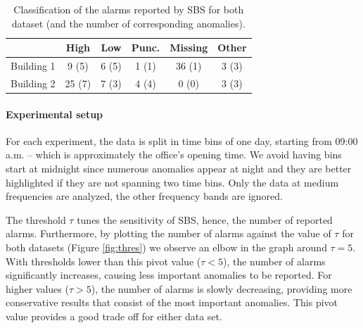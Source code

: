 \begin{table}
\begin{center}
\begin{tabular}{|l||c|c|c|c|c|}
\hline
&High&Low&Punc.&Missing&Other\\ \hline \hline
Building 1& 9 (5) & 6 (5) & 1 (1) & 36 (1) & 3 (3) \\ \hline
Building 2& 25 (7) & 7 (3) & 4 (4) & 0 (0) & 3 (3) \\ \hline
\end{tabular}
\end{center}
\caption{Classification of the alarms reported by SBS for both dataset (and the number of corresponding anomalies).}
\label{tab:classif}
\end{table}

\paragraph{Experimental setup}
For each experiment, the data is split in time bins of one day, starting from 09:00 a.m. -- which is approximately 
the office's opening time.
We avoid having bins start at midnight since numerous anomalies appear at night and they are better highlighted if they are 
not spanning two time bins.
Only the data at medium frequencies are analyzed, the other frequency bands are ignored.


The threshold $\tau$ tunes the sensitivity of SBS, hence, the number of reported alarms.  
Furthermore, by plotting the number of alarms against the value of $\tau$ for both datasets (Figure \ref{fig:thres}) we observe an 
elbow in the graph around $\tau=5$.
With thresholds lower than this pivot value ($\tau<5$), the number of alarms significantly increases, causing less important anomalies 
to be reported.  
For higher values ($\tau>5$), the number of alarms is slowly decreasing, providing more conservative results that consist of the 
most important anomalies.
This pivot value provides a good trade off for either data set.

